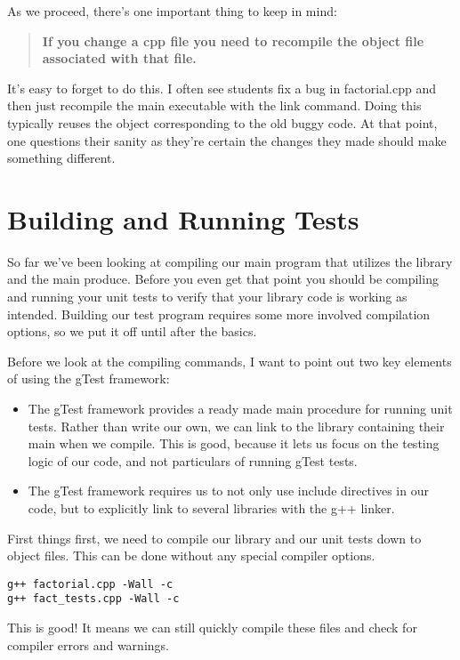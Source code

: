 \documentclass[]{tufte-handout}
\begin{document}
As we proceed, there's one important thing to keep in mind:
\begin{quote}
\textbf{If you change a cpp file you need to recompile the object file associated with that file.}
\end{quote}

It's easy to forget to do this.  I often see students fix a bug in factorial.cpp and then just recompile the main executable with the link command.  Doing this typically reuses the object corresponding to the old buggy code. At that point, one questions their sanity as they're certain the changes they made should make something different.

\section{Building and Running Tests}

So far we've been looking at compiling our main program that utilizes the library and the main produce.  Before you even get that point you should be compiling and running your unit tests to verify that your library code is working as intended.  Building our test program requires some more involved compilation options, so we put it off until after the basics.

Before we look at the compiling commands, I want to point out two key elements of using the gTest framework:
\begin{itemize}
\item The gTest framework provides a ready made main procedure for running unit tests.  Rather than write our own, we can link to the library containing their main when we compile. This is good, because it lets us focus on the testing logic of our code, and not particulars of running gTest tests.
\item The gTest framework requires us to not only use include directives in our code, but to explicitly link to several  libraries with the g++ linker. 
\end{itemize}

First things first, we need to compile our library and our unit tests down to object files. This can be done without any special compiler options.
\begin{verbatim}
g++ factorial.cpp -Wall -c
g++ fact_tests.cpp -Wall -c
\end{verbatim}
This is good! It means we can still quickly compile these files and check for compiler errors and warnings.
\end{document}
